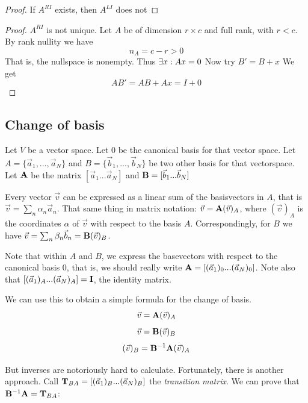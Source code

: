 \begin{proof}
If $A^{RI}$ exists, then $A^{LI}$ does not
\end{proof}

\begin{proof}
    $A^{RI}$ is not unique.
    Let $A$ be of dimension $r \times c$ and full rank, with $r < c$. By rank nullity we have
    $$ n_A = c - r > 0 $$
    That is, the nullspace is nonempty. Thus $\exists x : Ax = 0$
    Now try $B' = B + x$
    We get 
    $$ AB' = AB + Ax = I + 0$$
\end{proof}


\subsection{Change of basis}\label{changeOfBasis}

Let $V$ be a vector space. Let $0$ be the canonical basis for that vector space. Let $A = \{\vec{a}_1, ..., \vec{a}_N \}$ and $B = \{\vec{b}_1, ..., \vec{b}_N\}$ be two other basis for that vectorspace. Let $\mathbf{A}$ be the matrix $[\vec{a}_1  ...  \vec{a}_N]$ and $\mathbf{B} = [\vec{b}_1 ... \vec{b}_N]$

Every vector $\vec{v}$ can be expressed as a linear sum of the basisvectors in $A$, that is $\vec{v} = \sum_n \alpha_n \vec{a}_n$. That same thing in matrix notation: $\vec{v} = \mathbf{A}(\vec{v})_A$, where $(\vec{v})_A$ is the coordinates $\alpha$ of $\vec{v}$ with respect to the basis $A$. Correspondingly, for $B$ we have $\vec{v} = \sum_n \beta_n \vec{b}_n = \mathbf{B}(\vec{v})_B$.

Note that within $A$ and $B$, we express the basevectors with respect to the canonical basis $0$, that is, we should really write $\mathbf{A} = [(\vec{a}_1)_0  ...  (\vec{a}_N)_0]$. Note also that $[(\vec{a}_1)_A  ...  (\vec{a}_N)_A] = \mathbf{I}$, the identity matrix. 

We can use this to obtain a simple formula for the change of basis. 
$$ \vec{v} = \mathbf{A} (\vec{v})_A $$
$$ \vec{v} = \mathbf{B} (\vec{v})_B $$
$$ (\vec{v})_B = \mathbf{B}^{-1} \mathbf{A} (\vec{v})_A $$

But inverses are notoriously hard to calculate. Fortunately, there is another approach. Call $\mathbf{T}_{BA} = [(\vec{a}_1)_B ... (\vec{a}_N)_B]$ the \emph{transition matrix}. We can prove that $\mathbf{B}^{-1} \mathbf{A} = \mathbf{T}_{BA}$:

